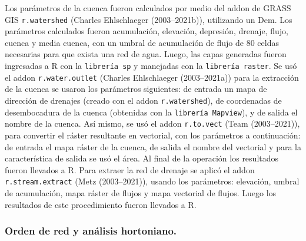 \documentclass[11pt,]{article}
\begin{document}
Los parámetros de la cuenca fueron calculados por medio del addon de
GRASS GIS \texttt{r.watershed} (Charles Ehlschlaeger (2003--2021b)),
utilizando un Dem. Los parámetros calculados fueron acumulación,
elevación, depresión, drenaje, flujo, cuenca y media cuenca, con un
umbral de acumulación de flujo de 80 celdas necesarias para que exista
una red de agua. Luego, las capas generadas fueron ingresadas a R con la
\texttt{librería\ sp} y manejadas con la \texttt{librería\ raster}. Se
usó el addon \texttt{r.water.outlet} (Charles Ehlschlaeger
(2003--2021a)) para la extracción de la cuenca se usaron los parámetros
siguientes: de entrada un mapa de dirección de drenajes (creado con el
addon \texttt{r.watershed}), de coordenadas de desembocadura de la
cuenca (obtenidas con la \texttt{librería\ Mapview}), y de salida el
nombre de la cuenca. Así mismo, se usó el addon \texttt{r.to.vect} (Team
(2003--2021)), para convertir el ráster resultante en vectorial, con los
parámetros a continuación: de entrada el mapa ráster de la cuenca, de
salida el nombre del vectorial y para la característica de salida se usó
el área. Al final de la operación los resultados fueron llevados a R.
Para extraer la red de drenaje se aplicó el addon
\texttt{r.stream.extract} (Metz (2003--2021)), usando los parámetros:
elevación, umbral de acumulación, mapa ráster de flujos y mapa vectorial
de flujos. Luego los resultados de este procedimiento fueron llevados a
R.

\subsubsection{Orden de red y análisis
hortoniano.}\label{orden-de-red-y-anuxe1lisis-hortoniano.}
\end{document}

